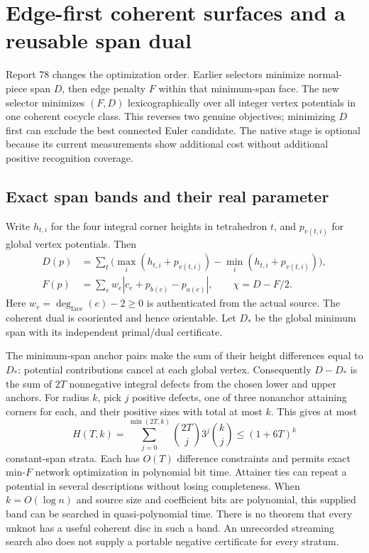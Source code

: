 \section{Edge-first coherent surfaces and a reusable span dual}
\label{sec:cocycle-lex-native}

Report 78 changes the optimization order. Earlier selectors minimize
normal-piece span $D$, then edge penalty $F$ within that minimum-span face.
The new selector minimizes $(F,D)$ lexicographically over all integer
vertex potentials in one coherent cocycle class. This reverses two genuine
objectives; minimizing $D$ first can exclude the best connected Euler
candidate. The native stage is optional because its current measurements
show additional cost without additional positive recognition coverage.

\subsection{Exact span bands and their real parameter}

Write $h_{t,i}$ for the four integral corner heights in tetrahedron $t$,
and $p_{v(t,i)}$ for global vertex potentials. Then
\begin{align*}
 D(p)&=\sum_t\bigl(\max_i(h_{t,i}+p_{v(t,i)})
                   -\min_i(h_{t,i}+p_{v(t,i)})\bigr),\\
 F(p)&=\sum_e w_e|c_e+p_{b(e)}-p_{a(e)}|,
 \qquad \chi=D-F/2.
\end{align*}
Here $w_e=\deg_{\mathrm{face}}(e)-2\ge0$ is authenticated from the actual
source. The coherent dual is cooriented and hence orientable. Let $D_*$
be the global minimum span with its independent primal/dual certificate.

The minimum-span anchor pairs make the sum of their height differences
equal to $D_*$: potential contributions cancel at each global vertex.
Consequently $D-D_*$ is the sum of $2T$ nonnegative integral defects from
the chosen lower and upper anchors. For radius $k$, pick $j$ positive
defects, one of three nonanchor attaining corners for each, and their
positive sizes with total at most $k$. This gives at most
\[
 H(T,k)=\sum_{j=0}^{\min(2T,k)}\binom{2T}{j}3^j\binom{k}{j}
           \le(1+6T)^k
\]
constant-span strata. Each has $O(T)$ difference constraints and permits
exact min-$F$ network optimization in polynomial bit time. Attainer ties
can repeat a potential in several descriptions without losing completeness.
When $k=O(\log n)$ and source size and coefficient bits are polynomial,
this supplied band can be searched in quasi-polynomial time.
There is no theorem that every unknot has a useful coherent disc in such
a band. An unrecorded streaming search also does not supply a portable
negative certificate for every stratum.


